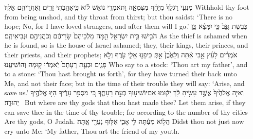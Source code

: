 {מִנְעִ֤י רַגְלֵךְ֙ מִיָּחֵ֔ף  מִצִּמְאָ֑ה וַתֹּאמְרִ֣י נוֹאָ֔שׁ ל֕וֹא כִּֽי\maqqaf אָהַ֥בְתִּי זָרִ֖ים וְאַחֲרֵיהֶ֥ם אֵלֵֽךְ׃}
{Withhold thy foot from being unshod, and thy throat from thirst; but thou saidst: ‘There is no hope; No, for I have loved strangers, and after them will I go.’}
{כְּבֹ֤שֶׁת גַּנָּב֙ כִּ֣י יִמָּצֵ֔א כֵּ֥ן הֹבִ֖ישׁוּ בֵּ֣ית יִשְׂרָאֵ֑ל הֵ֤מָּה מַלְכֵיהֶם֙ שָׂרֵיהֶ֔ם וְכֹהֲנֵיהֶ֖ם וּנְבִיאֵיהֶֽם׃}
{As the thief is ashamed when he is found, so is the house of Israel ashamed; they, their kings, their princes, and their priests, and their prophets;}
{אֹמְרִ֨ים לָעֵ֜ץ אָ֣בִי אַ֗תָּה וְלָאֶ֙בֶן֙ אַ֣תְּ  כִּֽי\maqqaf פָנ֥וּ אֵלַ֛י עֹ֖רֶף וְלֹ֣א פָנִ֑ים וּבְעֵ֤ת רָעָתָם֙ יֹֽאמְר֔וּ ק֖וּמָה וְהוֹשִׁיעֵֽנוּ׃}
{Who say to a stock: ‘Thou art my father’, and to a stone: ‘Thou hast brought us forth’, for they have turned their back unto Me, and not their face; but in the time of their trouble they will say: ‘Arise, and save us.’}
{וְאַיֵּ֤ה אֱלֹהֶ֙יךָ֙ אֲשֶׁ֣ר עָשִׂ֣יתָ לָּ֔ךְ יָק֕וּמוּ אִם\maqqaf יוֹשִׁיע֖וּךָ בְּעֵ֣ת רָעָתֶ֑ךָ כִּ֚י מִסְפַּ֣ר עָרֶ֔יךָ הָי֥וּ אֱלֹהֶ֖יךָ יְהוּדָֽה׃ \setuma }
{But where are thy gods that thou hast made thee? Let them arise, if they can save thee in the time of thy trouble; for according to the number of thy cities Are thy gods, O Judah.}
\setcounter{chap}{3}
\setcounter{verse}{4}
{הֲל֣וֹא מֵעַ֔תָּה  לִ֖י אָבִ֑י אַלּ֥וּף נְעֻרַ֖י אָֽתָּה׃}
{Didst thou not just now cry unto Me: ‘My father, Thou art the friend of my youth.}
